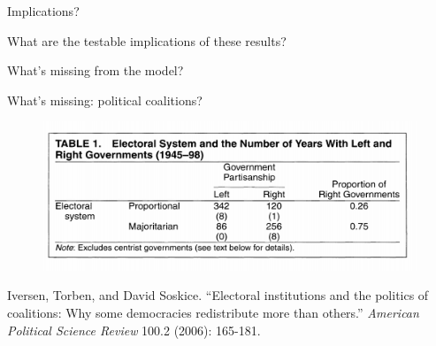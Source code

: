 \documentclass[11pt,aspectratio=169]{beamer}
\begin{document}
\begin{frame}{Implications?}

\begin{tcolorbox}
What are the testable implications of these results?
\end{tcolorbox}

\pause 

\begin{tcolorbox}
What's missing from the model?
\end{tcolorbox}
\end{frame}

\begin{frame}{What's missing: political coalitions? }

\begin{figure}
\centering
\includegraphics[width=\textwidth]{iversen.png}
\end{figure}

\vspace{-1em}
\footnotesize Iversen, Torben, and David Soskice. ``Electoral institutions and the politics of coalitions: Why some democracies redistribute more than others.'' \textit{American Political Science Review} 100.2 (2006): 165-181.

\end{frame}

\end{document}
